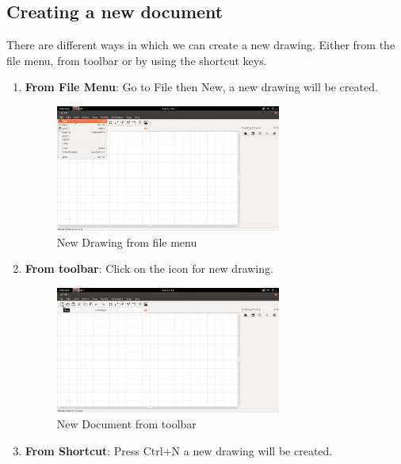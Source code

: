 \subsection{Creating a new document}
There are different ways in which we can create a new drawing. Either from the file menu, from toolbar or by using the shortcut keys. 
\begin{enumerate}
\item \textbf{From File Menu}:
Go to File then New, a new drawing will be created. 
\begin{figure}[h!]
\centering
\includegraphics[width=0.7\textwidth]{images/filenew.png}
\caption{New Drawing from file menu}
\end{figure}
\item \textbf{From toolbar}:
Click on the icon for new drawing.
\begin{figure}[h!]
\centering
\includegraphics[width=0.7\textwidth]{images/toolnew.png}
\caption{New Document from toolbar}
\end{figure}
\item \textbf{From Shortcut}: Press Ctrl+N a new drawing will be created.
\end{enumerate}
\newpage
